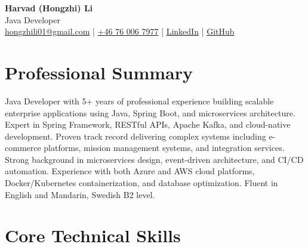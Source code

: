 \documentclass[11pt,a4paper]{article}
\begin{document}
\pagestyle{empty}

\begin{center}
{\LARGE \textbf{Harvad (Hongzhi) Li}}\\[10pt]
{\Large Java Developer}\\[10pt]
\textcolor{linkedinblue}{\href{mailto:hongzhili01@gmail.com}{hongzhili01@gmail.com} | \href{tel:+46760067977}{+46 76 006 7977} | \href{https://www.linkedin.com/in/harvad/}{LinkedIn} | \href{https://github.com/bluehawana}{GitHub}}
\end{center}

\section*{Professional Summary}

Java Developer with 5+ years of professional experience building scalable enterprise applications using Java, Spring Boot, and microservices architecture. Expert in Spring Framework, RESTful APIs, Apache Kafka, and cloud-native development. Proven track record delivering complex systems including e-commerce platforms, mission management systems, and integration services. Strong background in microservices design, event-driven architecture, and CI/CD automation. Experience with both Azure and AWS cloud platforms, Docker/Kubernetes containerization, and database optimization. Fluent in English and Mandarin, Swedish B2 level.

\section*{Core Technical Skills}
\end{document}
